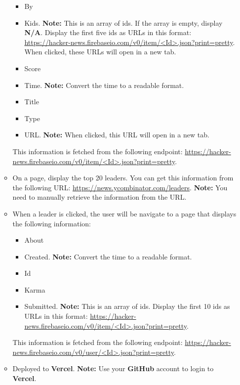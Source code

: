 \documentclass{article}
\begin{document}
\begin{itemize}
\begin{itemize}
	\begin{itemize}
		\item By
		\item Kids. \textbf{Note:} This is an array of ids. If the array is empty, display \textbf{N/A}. Display the first five ids as URLs in this format: \href{https://hacker-news.firebaseio.com/v0/item/<Id>.json?print=pretty}{https://hacker-news.firebaseio.com/v0/item/<Id>.json?print=pretty}. When clicked, these URLs will open in a new tab. 
		\item Score
		\item Time. \textbf{Note:} Convert the time to a readable format.
		\item Title
		\item Type 
		\item URL. \textbf{Note:} When clicked, this URL will open in a new tab.
	\end{itemize}
	This information is fetched from the following endpoint: \href{https://hacker-news.firebaseio.com/v0/item/<Id>.json?print=pretty}{https://hacker-news.firebaseio.com/v0/item/<Id>.json?print=pretty}.
	\item On a page, display the top 20 leaders. You can get this information from the following URL: \href{https://news.ycombinator.com/leaders}{https://news.ycombinator.com/leaders}. \textbf{Note:} You need to manually retrieve the information from the URL. 
	\item When a leader is clicked, the user will be navigate to a page that displays the following information:
	\begin{itemize}
		\item About
		\item Created. \textbf{Note:} Convert the time to a readable format.
		\item Id
		\item Karma
		\item Submitted. \textbf{Note:} This is an array of ids. Display the first 10 ids as URLs in this format: \href{https://hacker-news.firebaseio.com/v0/item/<Id>.json?print=pretty}{https://hacker-news.firebaseio.com/v0/item/<Id>.json?print=pretty}.
	\end{itemize}
	This information is fetched from the following endpoint: \href{https://hacker-news.firebaseio.com/v0/user/<Id>.json?print=pretty}{https://hacker-news.firebaseio.com/v0/user/<Id>.json?print=pretty}.
	\item Deployed to \textbf{Vercel}. \textbf{Note:} Use your \textbf{GitHub} account to login to \textbf{Vercel}.
\end{itemize}

\end{itemize}
\end{document}
